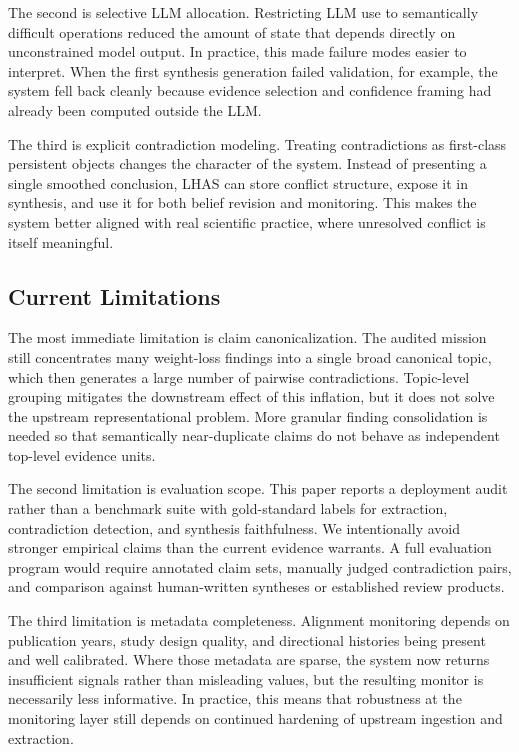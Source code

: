 \documentclass[manuscript,screen,review]{jair}
\begin{document}
The second is selective LLM allocation. Restricting LLM use to semantically difficult operations reduced the amount of state that depends directly on unconstrained model output. In practice, this made failure modes easier to interpret. When the first synthesis generation failed validation, for example, the system fell back cleanly because evidence selection and confidence framing had already been computed outside the LLM.

The third is explicit contradiction modeling. Treating contradictions as first-class persistent objects changes the character of the system. Instead of presenting a single smoothed conclusion, LHAS can store conflict structure, expose it in synthesis, and use it for both belief revision and monitoring. This makes the system better aligned with real scientific practice, where unresolved conflict is itself meaningful.

\subsection{Current Limitations}
The most immediate limitation is claim canonicalization. The audited mission still concentrates many weight-loss findings into a single broad canonical topic, which then generates a large number of pairwise contradictions. Topic-level grouping mitigates the downstream effect of this inflation, but it does not solve the upstream representational problem. More granular finding consolidation is needed so that semantically near-duplicate claims do not behave as independent top-level evidence units.

The second limitation is evaluation scope. This paper reports a deployment audit rather than a benchmark suite with gold-standard labels for extraction, contradiction detection, and synthesis faithfulness. We intentionally avoid stronger empirical claims than the current evidence warrants. A full evaluation program would require annotated claim sets, manually judged contradiction pairs, and comparison against human-written syntheses or established review products.

The third limitation is metadata completeness. Alignment monitoring depends on publication years, study design quality, and directional histories being present and well calibrated. Where those metadata are sparse, the system now returns insufficient signals rather than misleading values, but the resulting monitor is necessarily less informative. In practice, this means that robustness at the monitoring layer still depends on continued hardening of upstream ingestion and extraction.
\end{document}
